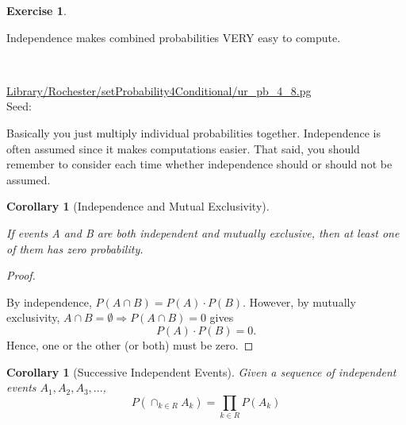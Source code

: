\documentclass[10pt,]{book}
\theoremstyle{plain}
\newtheorem{corollary}[theorem]{Corollary}
\theoremstyle{definition}
\theoremstyle{definition}
\theoremstyle{definition}
\newtheorem{exercise}[theorem]{Exercise}
\numberwithin{equation}{section}
\begin{document}
\begin{exercise}\label{exercise-12}

		Independence makes combined probabilities VERY easy to compute.
\par\medskip
\mbox{}\\ %
\begin{mdframed}
{}\par\vspace*{2ex}%
{\tiny\ttfamily\noindent\url{Library/Rochester/setProbability4Conditional/ur_pb_4_8.pg}\\Seed: \hfill}\end{mdframed}
\medskip\noindent 
		Basically you just multiply individual probabilities together.  Independence is often
		assumed since it makes computations easier. That said, you should remember to consider
		each time whether independence should or should not be assumed.
\par
\end{exercise}
\begin{corollary}[{Independence and Mutual Exclusivity}]\label{corollary-4}

			If events A and B are both independent and mutually exclusive, then at least one of them has zero probability.
		\end{corollary}
\begin{proof}\hypertarget{proof-20}{}

			By independence, \(P(A \cap B) = P(A) \cdot P(B)\). However, by mutually exclusivity, \(A \cap B = \emptyset \Rightarrow P(A \cap B) = 0\) gives
			\begin{equation*}P(A) \cdot P(B) = 0.\end{equation*}
			Hence, one or the other (or both) must be zero.
\end{proof}
\begin{corollary}[{Successive Independent Events}]\label{corollary-5}
Given a sequence of independent events \(A_1, A_2, A_3, ...\),
		\begin{equation*}P(\cap_{k \in R} A_k) = \prod_{k \in R} P(A_k)\end{equation*}\end{corollary}
\typeout{************************************************}
\typeout{************************************************}
\end{document}
